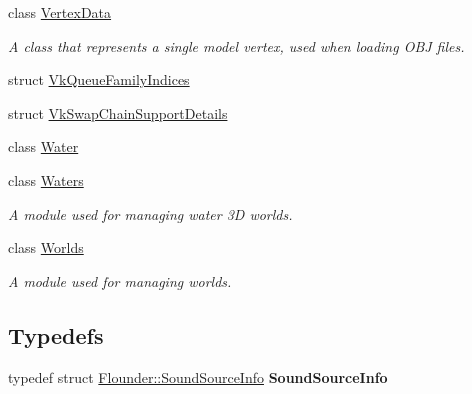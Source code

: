 \begin{DoxyCompactItemize}
class \hyperlink{class_flounder_1_1_vertex_data}{Vertex\+Data}
\begin{DoxyCompactList}\small\item\em A class that represents a single model vertex, used when loading O\+BJ files. \end{DoxyCompactList}\item 
struct \hyperlink{struct_flounder_1_1_vk_queue_family_indices}{Vk\+Queue\+Family\+Indices}
\item 
struct \hyperlink{struct_flounder_1_1_vk_swap_chain_support_details}{Vk\+Swap\+Chain\+Support\+Details}
\item 
class \hyperlink{class_flounder_1_1_water}{Water}
\item 
class \hyperlink{class_flounder_1_1_waters}{Waters}
\begin{DoxyCompactList}\small\item\em A module used for managing water 3D worlds. \end{DoxyCompactList}\item 
class \hyperlink{class_flounder_1_1_worlds}{Worlds}
\begin{DoxyCompactList}\small\item\em A module used for managing worlds. \end{DoxyCompactList}\end{DoxyCompactItemize}
\subsection*{Typedefs}
\begin{DoxyCompactItemize}
\item 
\mbox{\label{namespace_flounder_aef3656fbbccfef97b2809894a87beb12}} 
typedef struct \hyperlink{struct_flounder_1_1_sound_source_info}{Flounder\+::\+Sound\+Source\+Info} {\bfseries Sound\+Source\+Info}
\end{DoxyCompactItemize}
